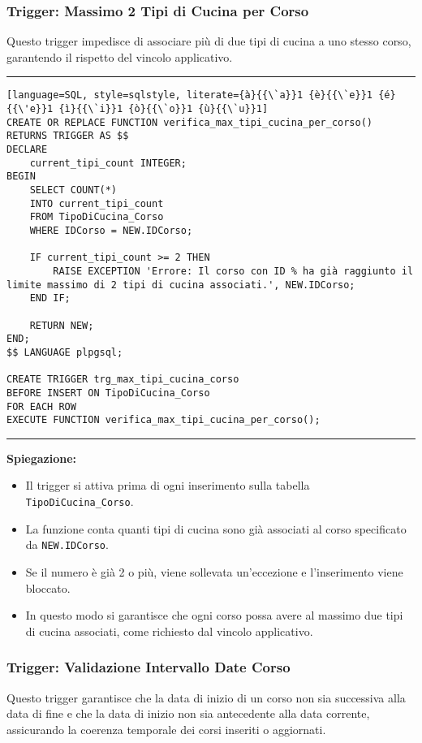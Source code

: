 \subsubsection{Trigger: Massimo 2 Tipi di Cucina per Corso}

Questo trigger impedisce di associare più di due tipi di cucina a uno stesso corso, garantendo il rispetto del vincolo applicativo.

\noindent\rule{\textwidth}{0.4pt}
\begin{lstlisting}[language=SQL, style=sqlstyle, literate={à}{{\`a}}1 {è}{{\`e}}1 {é}{{\'e}}1 {ì}{{\`i}}1 {ò}{{\`o}}1 {ù}{{\`u}}1]
CREATE OR REPLACE FUNCTION verifica_max_tipi_cucina_per_corso()
RETURNS TRIGGER AS $$
DECLARE
    current_tipi_count INTEGER;
BEGIN
    SELECT COUNT(*)
    INTO current_tipi_count
    FROM TipoDiCucina_Corso
    WHERE IDCorso = NEW.IDCorso;

    IF current_tipi_count >= 2 THEN
        RAISE EXCEPTION 'Errore: Il corso con ID % ha già raggiunto il limite massimo di 2 tipi di cucina associati.', NEW.IDCorso;
    END IF;

    RETURN NEW;
END;
$$ LANGUAGE plpgsql;

CREATE TRIGGER trg_max_tipi_cucina_corso
BEFORE INSERT ON TipoDiCucina_Corso
FOR EACH ROW
EXECUTE FUNCTION verifica_max_tipi_cucina_per_corso();
\end{lstlisting}
\noindent\rule{\textwidth}{0.4pt}

\textbf{Spiegazione:}
\begin{itemize}
    \item Il trigger si attiva prima di ogni inserimento sulla tabella \texttt{TipoDiCucina\_Corso}.
    \item La funzione conta quanti tipi di cucina sono già associati al corso specificato da \texttt{NEW.IDCorso}.
    \item Se il numero è già 2 o più, viene sollevata un'eccezione e l'inserimento viene bloccato.
    \item In questo modo si garantisce che ogni corso possa avere al massimo due tipi di cucina associati, come richiesto dal vincolo applicativo.
\end{itemize}

\subsubsection{Trigger: Validazione Intervallo Date Corso}

Questo trigger garantisce che la data di inizio di un corso non sia successiva alla data di fine e che la data di inizio non sia antecedente alla data corrente, assicurando la coerenza temporale dei corsi inseriti o aggiornati.

